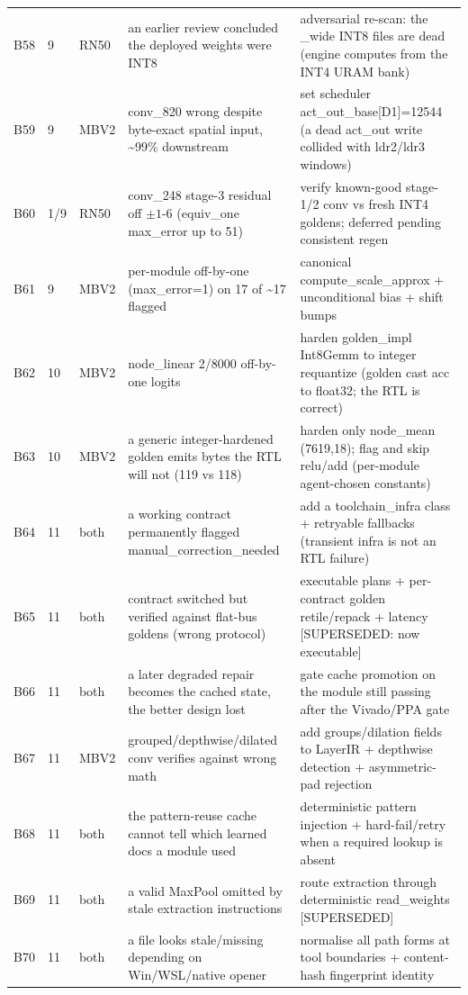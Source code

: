\documentclass[acmtog,authorversion]{acmart}
\begin{document}
\begin{longtable}{@{}l l l p{} p{}@{}}
B58 & 9 & RN50 & an earlier review concluded the deployed weights were INT8 & adversarial re-scan: the \_wide INT8 files are dead (engine computes from the INT4 URAM bank) \\
B59 & 9 & MBV2 & conv\_820 wrong despite byte-exact spatial input, \textasciitilde{}99\% downstream & set scheduler act\_out\_base[D1]=12544 (a dead act\_out write collided with ldr2/ldr3 windows) \\
B60 & 1/9 & RN50 & conv\_248 stage-3 residual off $\pm1$-6 (equiv\_one max\_error up to 51) & verify known-good stage-1/2 conv vs fresh INT4 goldens; deferred pending consistent regen \\
B61 & 9 & MBV2 & per-module off-by-one (max\_error=1) on 17 of \textasciitilde{}17 flagged & canonical compute\_scale\_approx + unconditional bias + shift bumps \\
B62 & 10 & MBV2 & node\_linear 2/8000 off-by-one logits & harden golden\_impl Int8Gemm to integer requantize (golden cast acc to float32; the RTL is correct) \\
B63 & 10 & MBV2 & a generic integer-hardened golden emits bytes the RTL will not (119 vs 118) & harden only node\_mean (7619,18); flag and skip relu/add (per-module agent-chosen constants) \\
B64 & 11 & both & a working contract permanently flagged manual\_correction\_needed & add a toolchain\_infra class + retryable fallbacks (transient infra is not an RTL failure) \\
B65 & 11 & both & contract switched but verified against flat-bus goldens (wrong protocol) & executable plans + per-contract golden retile/repack + latency [SUPERSEDED: now executable] \\
B66 & 11 & both & a later degraded repair becomes the cached state, the better design lost & gate cache promotion on the module still passing after the Vivado/PPA gate \\
B67 & 11 & MBV2 & grouped/depthwise/dilated conv verifies against wrong math & add groups/dilation fields to LayerIR + depthwise detection + asymmetric-pad rejection \\
B68 & 11 & both & the pattern-reuse cache cannot tell which learned docs a module used & deterministic pattern injection + hard-fail/retry when a required lookup is absent \\
B69 & 11 & both & a valid MaxPool omitted by stale extraction instructions & route extraction through deterministic read\_weights [SUPERSEDED] \\
B70 & 11 & both & a file looks stale/missing depending on Win/WSL/native opener & normalise all path forms at tool boundaries + content-hash fingerprint identity \\

\end{longtable}
\end{document}
